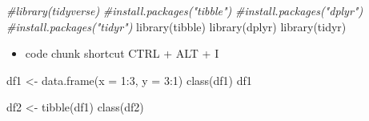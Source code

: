 \documentclass[
]{book}
\newenvironment{Shaded}{\begin{snugshade}}{\end{snugshade}}
\newcommand{\AttributeTok}[1]{\textcolor[rgb]{0.77,0.63,0.00}{#1}}
\newcommand{\CommentTok}[1]{\textcolor[rgb]{0.56,0.35,0.01}{\textit{#1}}}
\newcommand{\DecValTok}[1]{\textcolor[rgb]{0.00,0.00,0.81}{#1}}
\newcommand{\FunctionTok}[1]{\textcolor[rgb]{0.00,0.00,0.00}{#1}}
\newcommand{\NormalTok}[1]{#1}
\newcommand{\OtherTok}[1]{\textcolor[rgb]{0.56,0.35,0.01}{#1}}
\newcommand{\SpecialCharTok}[1]{\textcolor[rgb]{0.00,0.00,0.00}{#1}}
\providecommand{\tightlist}{%
  \setlength{\itemsep}{0pt}\setlength{\parskip}{0pt}}
\begin{document}
\begin{Shaded}
\begin{Highlighting}[]
\CommentTok{\#library(tidyverse)}
\CommentTok{\#install.packages("tibble")}
\CommentTok{\#install.packages("dplyr")}
\CommentTok{\#install.packages("tidyr")}
\FunctionTok{library}\NormalTok{(tibble)}
\FunctionTok{library}\NormalTok{(dplyr)}
\FunctionTok{library}\NormalTok{(tidyr)}
\end{Highlighting}
\end{Shaded}

\begin{itemize}
\tightlist
\item
  code chunk shortcut CTRL + ALT + I
\end{itemize}

\begin{Shaded}
\begin{Highlighting}[]
\NormalTok{df1 }\OtherTok{\textless{}{-}} \FunctionTok{data.frame}\NormalTok{(}\AttributeTok{x =} \DecValTok{1}\SpecialCharTok{:}\DecValTok{3}\NormalTok{, }\AttributeTok{y =} \DecValTok{3}\SpecialCharTok{:}\DecValTok{1}\NormalTok{)}
\FunctionTok{class}\NormalTok{(df1)}
\NormalTok{df1}

\NormalTok{df2 }\OtherTok{\textless{}{-}} \FunctionTok{tibble}\NormalTok{(df1)}
\FunctionTok{class}\NormalTok{(df2)}
\end{Highlighting}
\end{Shaded}
\end{document}
